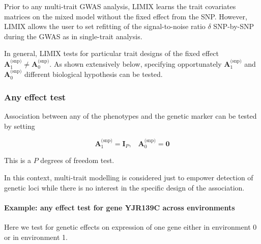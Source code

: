 \documentclass{article}
\begin{document}
Prior to any multi-trait GWAS analysis, LIMIX learns the trait
covariates matrices on the mixed model without the fixed effect from the
SNP. However, LIMIX allows the user to set refitting of the
signal-to-noise ratio $\delta$ SNP-by-SNP during the GWAS as in
single-trait analysis.

In general, LIMIX tests for particular trait designs of the fixed effect
$\mathbf{A}_1^\text{(snp)}\neq\mathbf{A}_0^\text{(snp)}$. As shown
extensively below, specifying opportunately $\mathbf{A}_1^\text{(snp)}$
and $\mathbf{A}_0^\text{(snp)}$ different biological hypothesis can be
tested.


    \subsubsection{Any effect test}


    Association between any of the phenotypes and the genetic marker can be
tested by setting

\begin{equation}
\mathbf{A}_1^\text{(snp)} = \mathbf{I}_P,\;\;\;
\mathbf{A}_0^\text{(snp)} = \mathbf{0}
\end{equation}

This is a $P$ degrees of freedom test.

In this context, multi-trait modelling is considered just to empower
detection of genetic loci while there is no interest in the specific
design of the association.


    \paragraph{Example: any effect test for gene YJR139C across environments}


    Here we test for genetic effects on expression of one gene either in
environment 0 or in environment 1.
\end{document}
